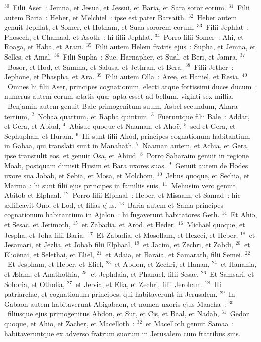 ${}^{30}$~Filii Aser~: Jemna, et Jesua, et Jessui, et Baria, et Sara soror eorum.
${}^{31}$~Filii autem Baria~: Heber, et Melchiel~: ipse est pater Barsaith.
${}^{32}$~Heber autem genuit Jephlat, et Somer, et Hotham, et Suaa sororem eorum.
${}^{33}$~Filii Jephlat~: Phosech, et Chamaal, et Asoth~: hi filii Jephlat.
${}^{34}$~Porro filii Somer~: Ahi, et Roaga, et Haba, et Aram.
${}^{35}$~Filii autem Helem fratris ejus~: Supha, et Jemna, et Selles, et Amal.
${}^{36}$~Filii Supha~: Sue, Harnapher, et Sual, et Beri, et Jamra,
${}^{37}$~Bosor, et Hod, et Samma, et Salusa, et Jethran, et Bera.
${}^{38}$~Filii Jether~: Jephone, et Phaspha, et Ara.
${}^{39}$~Filii autem Olla~: Aree, et Haniel, et Resia.
${}^{40}$~Omnes hi filii Aser, principes cognationum, electi atque fortissimi duces ducum~: numerus autem eorum \ae tatis qu\ae\ apta esset ad bellum, viginti sex millia.
~Benjamin autem genuit Bale primogenitum suum, Asbel secundum, Ahara tertium,
${}^{2}$~Nohaa quartum, et Rapha quintum.
${}^{3}$~Fueruntque filii Bale~: Addar, et Gera, et Abiud,
${}^{4}$~Abisue quoque et Naaman, et Aho\"e,
${}^{5}$~sed et Gera, et Sephuphan, et Huram.
${}^{6}$~Hi sunt filii Ahod, principes cognationum habitantium in Gabaa, qui translati sunt in Manahath.
${}^{7}$~Naaman autem, et Achia, et Gera, ipse transtulit eos, et genuit Osa, et Ahiud.
${}^{8}$~Porro Saharaim genuit in regione Moab, postquam dimisit Husim et Bara uxores suas.
${}^{9}$~Genuit autem de Hodes uxore sua Jobab, et Sebia, et Mosa, et Molchom,
${}^{10}$~Jehus quoque, et Sechia, et Marma~: hi sunt filii ejus principes in familiis suis.
${}^{11}$~Mehusim vero genuit Abitob et Elphaal.
${}^{12}$~Porro filii Elphaal~: Heber, et Misaam, et Samad~: hic \ae dificavit Ono, et Lod, et filias ejus.
${}^{13}$~Baria autem et Sama principes cognationum habitantium in Ajalon~: hi fugaverunt habitatores Geth.
${}^{14}$~Et Ahio, et Sesac, et Jerimoth,
${}^{15}$~et Zabadia, et Arod, et Heder,
${}^{16}$~Micha\"el quoque, et Jespha, et Joha filii Baria.
${}^{17}$~Et Zabadia, et Mosollam, et Hezeci, et Heber,
${}^{18}$~et Jesamari, et Jezlia, et Jobab filii Elphaal,
${}^{19}$~et Jacim, et Zechri, et Zabdi,
${}^{20}$~et Elio\"enai, et Selethai, et Eliel,
${}^{21}$~et Adaia, et Baraia, et Samarath, filii Semei.
${}^{22}$~Et Jespham, et Heber, et Eliel,
${}^{23}$~et Abdon, et Zechri, et Hanan,
${}^{24}$~et Hanania, et \AE lam, et Anathothia,
${}^{25}$~et Jephdaia, et Phanuel, filii Sesac.
${}^{26}$~Et Samsari, et Sohoria, et Otholia,
${}^{27}$~et Jersia, et Elia, et Zechri, filii Jeroham.
${}^{28}$~Hi patriarch\ae , et cognationum principes, qui habitaverunt in Jerusalem.
${}^{29}$~In Gabaon autem habitaverunt Abigabaon, et nomen uxoris ejus Maacha~:
${}^{30}$~filiusque ejus primogenitus Abdon, et Sur, et Cis, et Baal, et Nadab,
${}^{31}$~Gedor quoque, et Ahio, et Zacher, et Macelloth~:
${}^{32}$~et Macelloth genuit Samaa~: habitaveruntque ex adverso fratrum suorum in Jerusalem cum fratribus suis.


